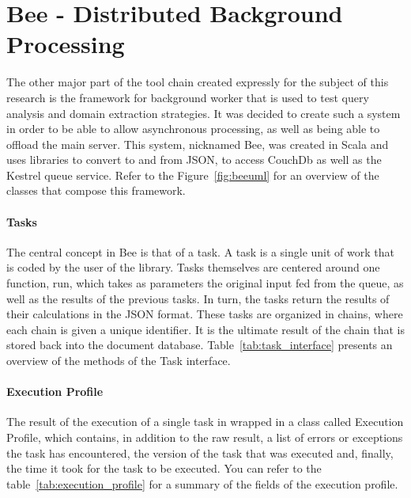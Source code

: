 
\section{Bee - Distributed Background Processing} %
\label{sec:bee_distributed_background_processing}

The other major part of the tool chain created expressly for the subject of this research is the framework for background worker that is used to test query analysis and domain extraction strategies. It was decided to create such a system in order to be able to allow asynchronous processing, as well as being able to offload the main server. This system, nicknamed Bee, was created in Scala and uses libraries to convert to and from JSON, to access CouchDb as well as the Kestrel queue service. Refer to the Figure~\ref{fig:beeuml} for an overview of the classes that compose this framework.

\paragraph{Tasks} %
\label{par:tasks}

The central concept in Bee is that of a task. A task is a single unit of work that is coded by the user of the library.  Tasks themselves are centered around one function, run, which takes as parameters the original input fed from the queue, as well as the results of the previous tasks. In turn, the tasks return the results of their calculations in the JSON format. These tasks are organized in chains, where each chain is given a unique identifier. It is the ultimate result of the chain that is stored back into the document database. Table~\ref{tab:task_interface} presents an overview of the methods of the Task interface.


\paragraph{Execution Profile} %
\label{par:execution_profile}

The result of the execution of a single task in wrapped in a class called Execution Profile, which contains, in addition to the raw result, a list of errors or exceptions the task has encountered, the version of the task that was executed and, finally, the time it took for the task to be executed. You can refer to the table~\ref{tab:execution_profile} for a summary of the fields of the execution profile.

